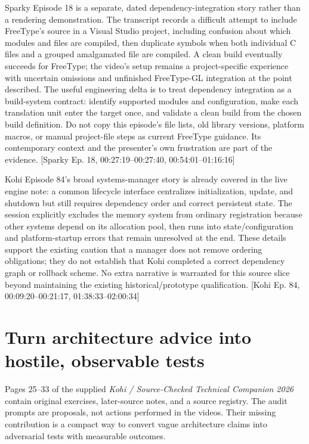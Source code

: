 Sparky Episode 18 is a separate, dated dependency-integration story rather than a rendering demonstration. The transcript records a difficult attempt to include FreeType's source in a Visual Studio project, including confusion about which modules and files are compiled, then duplicate symbols when both individual C files and a grouped amalgamated file are compiled. A clean build eventually succeeds for FreeType; the video's setup remains a project-specific experience with uncertain omissions and unfinished FreeType-GL integration at the point described. The useful engineering delta is to treat dependency integration as a build-system contract: identify supported modules and configuration, make each translation unit enter the target once, and validate a clean build from the chosen build definition. Do not copy this episode's file lists, old library versions, platform macros, or manual project-file steps as current FreeType guidance. Its contemporary context and the presenter's own frustration are part of the evidence. {[}Sparky Ep. 18, 00:27:19--00:27:40, 00:54:01--01:16:16{]}

Kohi Episode 84's broad systems-manager story is already covered in the live engine note: a common lifecycle interface centralizes initialization, update, and shutdown but still requires dependency order and correct persistent state. The session explicitly excludes the memory system from ordinary registration because other systems depend on its allocation pool, then runs into state/configuration and platform-startup errors that remain unresolved at the end. These details support the existing caution that a manager does not remove ordering obligations; they do not establish that Kohi completed a correct dependency graph or rollback scheme. No extra narrative is warranted for this source slice beyond maintaining the existing historical/prototype qualification. {[}Kohi Ep. 84, 00:09:20--00:21:17, 01:38:33--02:00:34{]}

\section{Turn architecture advice into hostile, observable tests}\label{06-engine-ii-ch046-turn-architecture-advice-into-hostile-observable-tests}

\hypertarget{06-engine-ii-ch046-turn-architecture-advice-into-hostile-observable-tests}{}

Pages 25--33 of the supplied \emph{Kohi / Source-Checked Technical Companion 2026} contain original exercises, later-source notes, and a source registry. The audit prompts are proposals, not actions performed in the videos. Their missing contribution is a compact way to convert vague architecture claims into adversarial tests with measurable outcomes.

